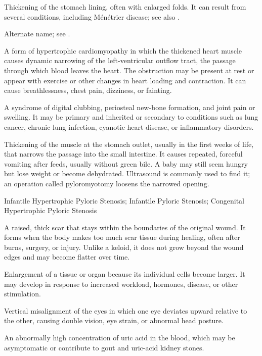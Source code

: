  Thickening of the stomach lining, often with enlarged folds. It can result from several conditions, including Ménétrier disease; see also .

 Alternate name; see .

 A form of hypertrophic cardiomyopathy in which the thickened heart muscle causes dynamic narrowing of the left-ventricular outflow tract, the passage through which blood leaves the heart. The obstruction may be present at rest or appear with exercise or other changes in heart loading and contraction. It can cause breathlessness, chest pain, dizziness, or fainting.

 A syndrome of digital clubbing, periosteal new-bone formation, and joint pain or swelling. It may be primary and inherited or secondary to conditions such as lung cancer, chronic lung infection, cyanotic heart disease, or inflammatory disorders.

 Thickening of the muscle at the stomach outlet, usually in the first weeks of life, that narrows the passage into the small intestine. It causes repeated, forceful vomiting after feeds, usually without green bile. A baby may still seem hungry but lose weight or become dehydrated. Ultrasound is commonly used to find it; an operation called pyloromyotomy loosens the narrowed opening.

\synonyms
Infantile Hypertrophic Pyloric Stenosis; Infantile Pyloric Stenosis; Congenital Hypertrophic Pyloric Stenosis

 A raised, thick scar that stays within the boundaries of the original wound. It forms when the body
makes too much scar tissue during healing, often after burns, surgery, or injury. Unlike a keloid,
it does not grow beyond the wound edges and may become flatter over time.

 Enlargement of a tissue or organ because its individual cells become larger. It may develop in response to increased workload, hormones, disease, or other stimulation.

 Vertical misalignment of the eyes in which one eye deviates upward relative to the other, causing double vision, eye strain, or abnormal head posture.

 An abnormally high concentration of uric acid in the blood, which may be asymptomatic or contribute to gout and uric-acid kidney stones.

